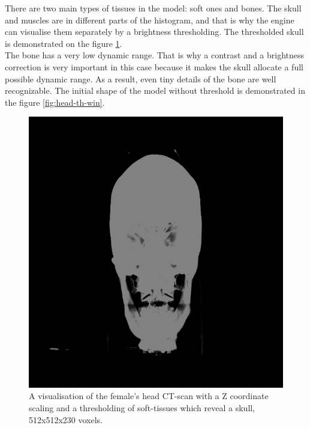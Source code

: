 \documentclass[twoside, english, 11pt]{report}
\begin{document}
There are two main types of tissues in the model: soft ones and bones. The skull and muscles are in different parts of the histogram, and that is why the engine can visualise them separately by a brightness thresholding. The thresholded skull is demonstrated on the figure \ref{fig:head-th}.\\

The bone has a very low dynamic range. That is why a contrast and a brightness correction is very important in this case because it makes the skull allocate a full possible dynamic range. As a result, even tiny details of the bone are well recognizable. The initial shape of the model without threshold is demonstrated in the figure \ref{fig:head-th-win}. \\

\begin{figure}[H]
\centerline{\includegraphics[scale = 0.44]{img/head-th}}
\caption{A visualisation of the female's head CT-scan with a Z coordinate scaling and a thresholding of soft-tissues which reveal a skull, 512x512x230 voxels.\label{fig:head-th}}
\end{figure}
\end{document}
